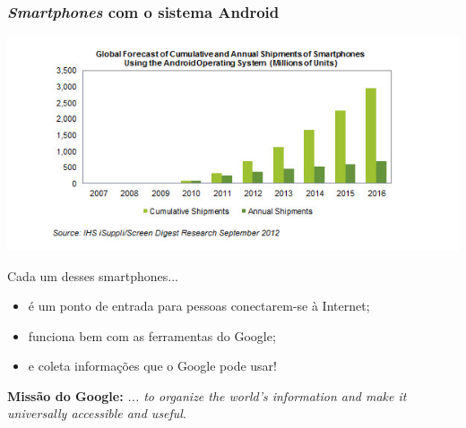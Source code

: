 \documentclass[xcolor=dvipsnames]{beamer}
\begin{document}
\begin{frame}
	\frametitle{\textit{Smartphones} com o sistema Android}
 	\includegraphics[scale=0.38]{android.png}
\pause
	{\small 
	\begin{block}{Cada um desses smartphones...}	
	\begin{itemize}
	\item é um ponto de entrada para pessoas conectarem-se à Internet;
	\item funciona bem com as ferramentas do Google;
	\item e coleta informações que o Google pode usar!
	\end{itemize}
	\end{block}
	}
	\begin{block}{}
	\textbf{Missão do Google:} \textit{... to organize the world's information and make it universally accessible and useful}.
	\end{block}
\end{frame}
\end{document}
